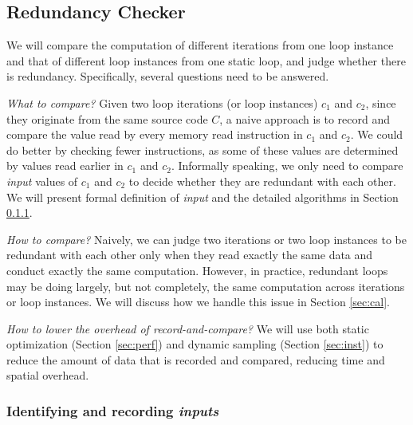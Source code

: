 \subsection{Redundancy Checker}
\label{sec:redundant}

We will compare the computation of different iterations
from one loop instance and that of different loop instances from 
one static loop,
and judge whether there is redundancy.
Specifically, several questions need to be answered.

\emph{What to compare?}
Given two loop iterations (or loop instances) $c_1$ and $c_2$, since they 
originate from the same source code $C$, 
a naive approach is to record and compare the value read by
every memory read instruction in $c_1$ and $c_2$. 
We could do better by checking fewer instructions, as
some of these values are determined by values read earlier in $c_1$ and
$c_2$. Informally speaking, we only need to compare \textit{input}
values of $c_1$ and $c_2$ to decide whether they are redundant with each other. 
We will present formal definition of \textit{input} and the detailed algorithms
in Section \ref{sec:dependence}.


\emph{How to compare?}
Naively, we can judge two iterations or two
loop instances to be redundant with each other only when they read exactly
the same data and conduct exactly the same computation. However,
in practice, redundant loops may be doing largely, but not completely,
the same computation across iterations or loop instances. 
We will discuss how we handle this issue in Section \ref{sec:cal}.



\emph{How to lower the overhead of record-and-compare?}
We will use both static optimization 
(Section \ref{sec:perf})
and dynamic sampling (Section \ref{sec:inst})
to reduce the amount of data that is recorded and compared, reducing
time and spatial overhead.

\subsubsection{Identifying and recording \textit{inputs}}
\label{sec:dependence}


